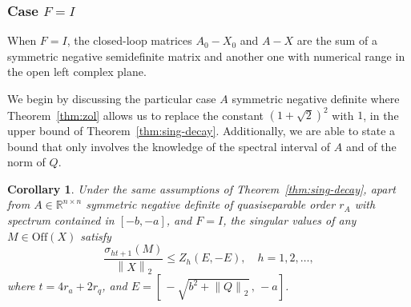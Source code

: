 \documentclass[a4paper,10pt]{article}
\newcommand{\norm}[1]{\left\lVert#1\right\rVert}
\newtheorem{corollary}[definition]{Corollary}
\begin{document}
\subsubsection{Case $F=I$}
When $F=I$, the closed-loop matrices $A_0-X_0$ and  $A-X$ are the sum of a symmetric negative semidefinite matrix and another one with numerical range in the open left complex plane.%

We begin by discussing  the particular case $A$ symmetric negative definite where   Theorem~\ref{thm:zol} allows us to replace the 
constant $(1+\sqrt 2)^2$ with $1$, in the upper bound of Theorem~\ref{thm:sing-decay}. Additionally, we are able to state a bound that only involves the  knowledge of the spectral interval of $A$ and of the norm of $Q$.

\begin{corollary}\label{cor:sing-decay1}
	Under the same assumptions of Theorem~\ref{thm:sing-decay}, apart from $A\in\mathbb R^{n\times n}$ symmetric negative definite of quasiseparable order $r_A$ with spectrum contained in $[-b,-a]$, and $F=I$,  the singular values of any $M\in\mathrm{Off}(X)$ satisfy
	$$
	\frac{\sigma_{ht+1}(M)}{\norm{X}_2}\le  Z_h(E,-E) ,%
	\quad h=1,2,\dots,
	$$
	where $t=4r_a+2r_q$, and $E=\left[\,-\sqrt{b^2 + \norm{Q}_2}\, ,\,  -a \right]$.
\end{corollary}
\end{document}
